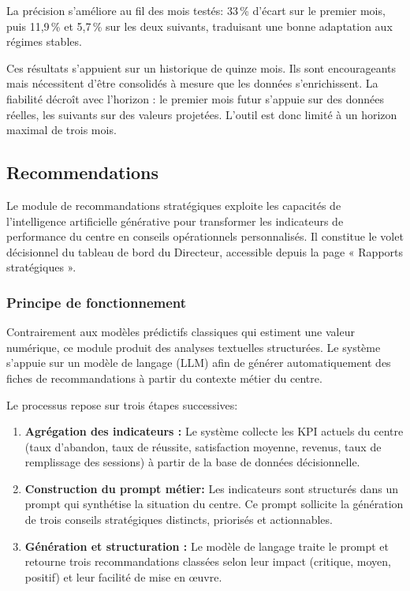 \noindent La précision s'améliore au fil des mois testés: 33\,\% d'écart sur le premier mois, puis 11,9\,\% et 5,7\,\% sur les deux suivants, traduisant une bonne adaptation aux régimes stables.

\noindent Ces résultats s'appuient sur un historique de quinze mois. Ils sont encourageants mais nécessitent d'être consolidés à mesure que les données s'enrichissent. La fiabilité décroît avec l'horizon : le premier mois futur s'appuie sur des données réelles, les suivants sur des valeurs projetées. L'outil est donc limité à un horizon maximal de trois mois.

\subsection{Recommendations}
Le module de recommandations stratégiques exploite les capacités de l'intelligence artificielle générative pour transformer les indicateurs de performance du centre en conseils opérationnels personnalisés. Il constitue le volet décisionnel du tableau de bord du Directeur, accessible depuis la page « Rapports stratégiques ».

\subsubsection{Principe de fonctionnement}

Contrairement aux modèles prédictifs classiques qui estiment une valeur numérique, ce module produit des analyses textuelles structurées. Le système s'appuie sur un modèle de langage (LLM) \cite{llm_cloudflare} afin de générer automatiquement des fiches de recommandations à partir du contexte métier du centre.

\noindent Le processus repose sur trois étapes successives:

\begin{enumerate}[leftmargin=*]
    \item \textbf{Agrégation des indicateurs :} Le système collecte les KPI actuels du centre (taux d'abandon, taux de réussite, satisfaction moyenne, revenus, taux de remplissage des sessions) à partir de la base de données décisionnelle.
    
    \item \textbf{Construction du prompt métier:} Les indicateurs sont structurés dans un prompt qui synthétise la situation du centre. Ce prompt sollicite la génération de trois conseils stratégiques distincts, priorisés et actionnables.
    
    \item \textbf{Génération et structuration :} Le modèle de langage traite le prompt et retourne trois recommandations classées selon leur impact (critique, moyen, positif) et leur facilité de mise en œuvre.
\end{enumerate}

